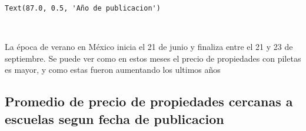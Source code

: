 \documentclass[11pt]{article}
\newcommand{\prompt}[4]{
        \llap{{\color{#2}[#3]: #4}}\vspace{-1.25em}
    }
\begin{document}
            \begin{tcolorbox}[breakable, boxrule=.5pt, size=fbox, pad at break*=1mm, opacityfill=0]
\prompt{Out}{outcolor}{529}{\hspace{3.5pt}}
\begin{Verbatim}[commandchars=\\\{\}]
Text(87.0, 0.5, 'Año de publicacion')
\end{Verbatim}
\end{tcolorbox}
        
    \begin{center}
    \end{center}
    { \hspace*{\fill} \\}
    
    La época de verano en México inicia el 21 de junio y finaliza entre el
21 y 23 de septiembre. Se puede ver como en estos meses el precio de
propiedades con piletas es mayor, y como estas fueron aumentando los
ultimos años

    \subsection{Promedio de precio de propiedades cercanas a escuelas segun
fecha de
publicacion}\label{promedio-de-precio-de-propiedades-cercanas-a-escuelas-segun-fecha-de-publicacion}
\end{document}
